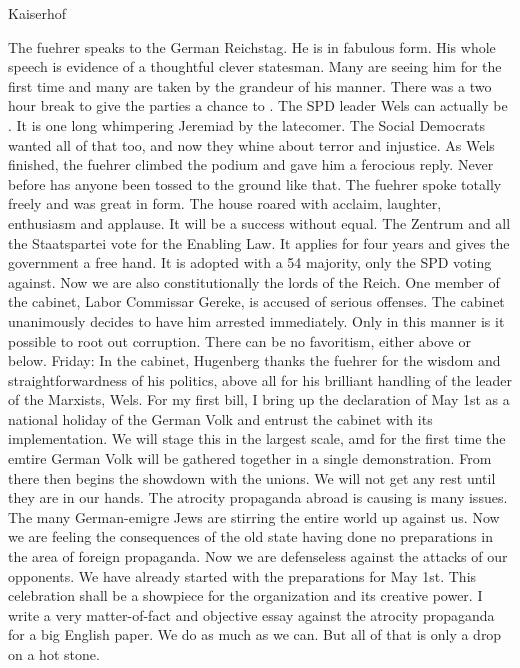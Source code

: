 Kaiserhof

The fuehrer speaks to the German Reichstag. He is in fabulous form. His whole speech is evidence of a thoughtful clever statesman. Many are seeing him for the first time and many are taken by the grandeur of his manner. There was a two hour break to give the parties a chance to . The SPD leader Wels can actually be . It is one long whimpering Jeremiad by the latecomer. The Social Democrats wanted all of that too, and now they whine about terror and injustice. As Wels finished, the fuehrer climbed the podium and gave him a ferocious reply. Never before has anyone been tossed to the ground like that. The fuehrer spoke totally freely and was great in form. The house roared with acclaim, laughter, enthusiasm and applause. It will be a success without equal. The Zentrum and all the Staatspartei vote for the Enabling Law. It applies for four years and gives the government a free hand. It is adopted with a 54 majority, only the SPD voting against. Now we are also constitutionally the lords of the Reich. One member of the cabinet, Labor Commissar Gereke, is accused of serious offenses. The cabinet unanimously decides to have him arrested immediately. Only in this manner is it possible to root out corruption. There can be no favoritism, either above or below. 
Friday: In the cabinet, Hugenberg thanks the fuehrer for the wisdom and straightforwardness of his politics, above all for his brilliant handling of the leader of the Marxists, Wels. For my first bill, I bring up the declaration of May 1st as a national holiday of the German Volk and entrust the cabinet with its implementation. We will stage this in the largest scale, amd for the first time the emtire German Volk will be gathered together in a single demonstration. From there then begins the showdown with the unions. We will not get any rest until they are in our hands. The atrocity propaganda abroad is causing is many issues. The many German-emigre Jews are stirring the entire world up against us. Now we are feeling the consequences of the old state having done no preparations in the area of foreign propaganda. Now we are defenseless against the attacks of our opponents. We have already started with the preparations for May 1st. This celebration shall be a showpiece for the organization and its creative power. I write a very matter-of-fact and objective essay against the atrocity propaganda for a big English paper. We do as much as we can. But all of that is only a drop on a hot stone.
